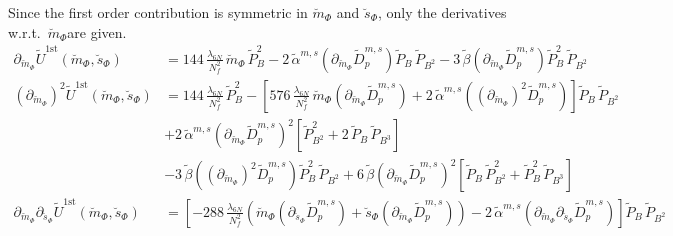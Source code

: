 Since the first order contribution is symmetric in $\breve m_{\Phi}$ and $\breve s_{\Phi}$, only the derivatives w.r.t.\ $\breve m_{\Phi}$are given. 
\begin{align}\label{eq:CEP_derivative_dm_firstOrder_rescaled}
 \partial_{\breve m_{\Phi}} \tilde U^{\text{1st}}(\breve m_{\Phi}, \breve s_{\Phi}) & = 
                           144\,\frac{\lambda_{6N}}{N_f^2}\, \breve m_{\Phi}\, \tilde P_B^2 
                         - 2\,\tilde \alpha^{m,s}\left( \partial_{\breve m_{\Phi}} \tilde D_p^{m,s} \right) \tilde P_B\, \tilde P_{B^2}
                         - 3\, \tilde \beta \left( \partial_{\breve m_{\Phi}} \tilde D_p^{m,s} \right) \tilde P_B^2\,  \tilde P_{B^2}
%                          
       \\ \label{eq:CEP_derivative_dmdm_firstOrder_rescaled}
 \left(\partial_{\breve m_{\Phi}}\right)^2 \tilde U^{\text{1st}}(\breve m_{\Phi}, \breve s_{\Phi}) & = 
                           144\,\frac{\lambda_{6N}}{N_f^2}\, \tilde P_B^2 -
                           \left[ 576\,\frac{\lambda_{6N}}{N_f^2}\,\breve m_{\Phi}\left( \partial_{\breve m_{\Phi}} \tilde D_p^{m,s} \right) 
                         + 2\,\tilde \alpha^{m,s}\left( \left(\partial_{\breve m_{\Phi}}\right)^2 \tilde D_p^{m,s} \right) \right] \tilde P_B\, \tilde P_{B^2}
       \nonumber \\
                       & + 2\,\tilde \alpha^{m,s}\left( \partial_{\breve m_{\Phi}} \tilde D_p^{m,s} \right)^2 \left[ \tilde P_{B^2}^2 + 2\, \tilde P_B\, \tilde P_{B^3} \right]
       \nonumber \\
                       & - 3\, \tilde \beta \left( \left(\partial_{\breve m_{\Phi}}\right)^2 \tilde D_p^{m,s} \right) \tilde P_B^2\,  \tilde P_{B^2}
                         + 6\, \tilde \beta \left( \partial_{\breve m_{\Phi}} \tilde D_p^{m,s} \right)^2 
                         \left[ \tilde P_B\,  \tilde P_{B^2}^2 + \tilde P_B^2\,  \tilde P_{B^3} \right]
%                          
      \\ \label{eq:CEP_derivative_dmds_firstOrder_rescaled}
 \partial_{\breve m_{\Phi}}\partial_{\breve s_{\Phi}}\tilde U^{\text{1st}}(\breve m_{\Phi}, \breve s_{\Phi}) & =
                         \left[- 288\,\frac{\lambda_{6N}}{N_f^2}\left( \breve m_{\Phi} \left( \partial_{\breve s_{\Phi}} \tilde D_p^{m,s} \right) + \breve s_{\Phi} \left( \partial_{\breve m_{\Phi}} \tilde D_p^{m,s} \right) \right)
                         - 2\,\tilde \alpha^{m,s} \left( \partial_{\breve m_{\Phi}} \partial_{\breve s_{\Phi}} \tilde D_p^{m,s} \right) \right] \tilde P_B\, \tilde P_{B^2}

\end{align}
